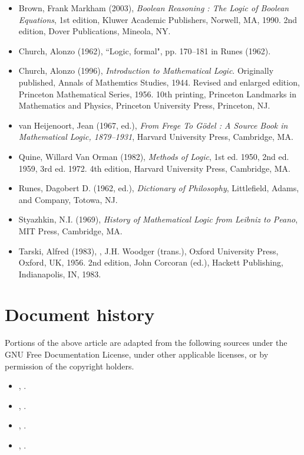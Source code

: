 \documentclass[12pt]{article}
\begin{document}
\begin{itemize}
\item
Brown, Frank Markham (2003), \textit{Boolean Reasoning : The Logic of Boolean Equations}, 1st edition, Kluwer Academic Publishers, Norwell, MA, 1990.  2nd edition, Dover Publications, Mineola, NY.
\item
Church, Alonzo (1962), ``Logic, formal", pp. 170--181 in Runes (1962).
\item
Church, Alonzo (1996), \textit{Introduction to Mathematical Logic}.  Originally published, Annals of Mathemtics Studies, 1944.  Revised and enlarged edition, Princeton Mathematical Series, 1956.  10th printing, Princeton Landmarks in Mathematics and Physics, Princeton University Press, Princeton, NJ.
\item
van Heijenoort, Jean (1967, ed.), \textit{From Frege To G\"{o}del : A Source Book in Mathematical Logic, 1879--1931}, Harvard University Press, Cambridge, MA.
\item
Quine, Willard Van Orman (1982), \textit{Methods of Logic}, 1st ed. 1950, 2nd ed. 1959, 3rd ed. 1972.  4th edition, Harvard University Press, Cambridge, MA.
\item
Runes, Dagobert D. (1962, ed.), \textit{Dictionary of Philosophy}, Littlefield, Adams, and Company, Totowa, NJ.
\item
Styazhkin, N.I. (1969), \textit{History of Mathematical Logic from Leibniz to Peano}, MIT Press, Cambridge, MA.
\item
Tarski, Alfred (1983), , J.H. Woodger (trans.), Oxford University Press, Oxford, UK, 1956.  2nd edition, John Corcoran (ed.), Hackett Publishing, Indianapolis, IN, 1983.
\end{itemize}

\section{Document history}

Portions of the above article are adapted from the following sources under the GNU Free Documentation License, under other applicable licenses, or by permission of the copyright holders.

\begin{itemize}
\item
{}, .
\item
{}, .
\item
{}, .
\item
{}, .
\end{itemize}

\end{document}
